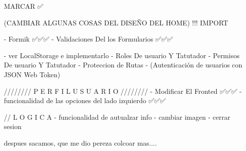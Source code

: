 
MARCAR ✅

(CAMBIAR ALGUNAS COSAS DEL DISEÑO DEL HOME) !!! IMPORT 

    - Formik ✅✅✅
    - Validaciones Del los Formularios ✅✅✅
    
    - ver LocalStorage e implementarlo
    - Roles De usuario Y Tatutador 
    - Permisos De usuario Y Tatutador
    - Proteccion de Rutas
    - (Autenticación de usuarios con JSON Web Token)


////////   P E R F I L   U S U A R I O   ////////  
    - Modificar El Fronted ✅✅✅
    - funcionalidad de las opciones del lado izquierdo ✅✅✅

    // L O G I C A
    - funcionalidad de autualzar info 
    - cambiar imagen
    - cerrar sesion 

despues sacamos, que me dio pereza colcoar mas....


